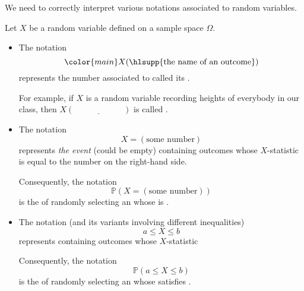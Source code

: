 \documentclass[../main.tex]{subfiles}
\begin{document}
We need to correctly interpret various notations associated to random variables.
\begin{definition}
  Let \(X\) be a random variable defined on a sample space \(\Omega\). 

  \begin{itemize}
    \item The notation 
      \[
        {\color{main} X(\text{\hlsupp{the name of an outcome}})}
      \] 
      represents the number associated to  called its .

      For example, if \(X\) is a random variable recording heights of everybody in our class, then \(X(\underline{\hspace{1in}})\) is \underline{\hspace{1.5cm}} called \underline{\hspace{2in}}.

    \item The notation 
      \[
        X = (\text{some number})
      \] 
      represents \emph{the event} (could be empty) containing outcomes whose \(X\)-statistic is equal to the number on the right-hand side. 

      Consequently, the notation
      \[
        \mathbb{P}(X = (\text{some number}))
      \]
      is the \underline{\hspace{1in}} of randomly selecting an \underline{\hspace{1in}} whose \underline{\hspace{1in}} is \underline{\hspace{2in}}.

    \item The notation (and its variants involving different inequalities)
      \[
        a \le X \le b
      \]
      represents \underline{\hspace{2in}} containing outcomes whose \(X\)-statistic 

      Consequently, the notation 
      \[
        \mathbb{P}(a \le X \le b)
      \]
      is the \underline{\hspace{1in}} of randomly selecting an \underline{\hspace{1in}} whose \underline{\hspace{1in}} satisfies \underline{\hspace{2in}}.
  \end{itemize}
\end{definition}
\end{document}
